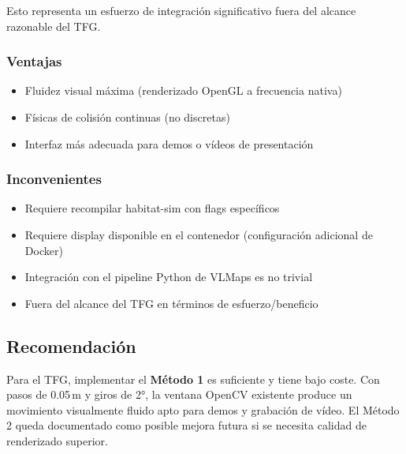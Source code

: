 \documentclass[11pt,a4paper]{article}
\begin{document}
Esto representa un esfuerzo de integración significativo fuera del alcance razonable del TFG.

\subsubsection*{Ventajas}
\begin{itemize}
    \item Fluidez visual máxima (renderizado OpenGL a frecuencia nativa)
    \item Físicas de colisión continuas (no discretas)
    \item Interfaz más adecuada para demos o vídeos de presentación
\end{itemize}

\subsubsection*{Inconvenientes}
\begin{itemize}
    \item Requiere recompilar habitat-sim con flags específicos
    \item Requiere display disponible en el contenedor (configuración adicional de Docker)
    \item Integración con el pipeline Python de VLMaps es no trivial
    \item Fuera del alcance del TFG en términos de esfuerzo/beneficio
\end{itemize}

\subsection{Recomendación}

Para el TFG, implementar el \textbf{Método 1} es suficiente y tiene bajo coste. Con pasos de 0.05\,m y giros de 2°, la ventana OpenCV existente produce un movimiento visualmente fluido apto para demos y grabación de vídeo. El Método 2 queda documentado como posible mejora futura si se necesita calidad de renderizado superior.
\end{document}
